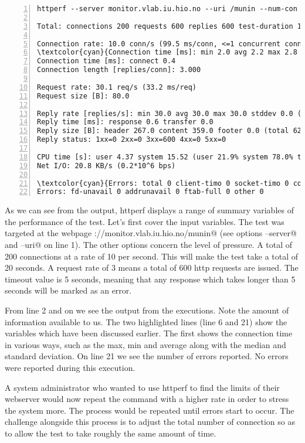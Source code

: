 \begin{Verbatim}[commandchars=\\\{\},numbers=left,label=Httperf execution example]
httperf --server monitor.vlab.iu.hio.no --uri /munin --num-con  200 --rate 10 --timeout 5 --num-call 3

Total: connections 200 requests 600 replies 600 test-duration 19.902 s

Connection rate: 10.0 conn/s (99.5 ms/conn, <=1 concurrent connections)
\textcolor{cyan}{Connection time [ms]: min 2.0 avg 2.2 max 2.8 median 2.5 stddev 0.1}
Connection time [ms]: connect 0.4
Connection length [replies/conn]: 3.000

Request rate: 30.1 req/s (33.2 ms/req)
Request size [B]: 80.0

Reply rate [replies/s]: min 30.0 avg 30.0 max 30.0 stddev 0.0 (3 samples)
Reply time [ms]: response 0.6 transfer 0.0
Reply size [B]: header 267.0 content 359.0 footer 0.0 (total 626.0)
Reply status: 1xx=0 2xx=0 3xx=600 4xx=0 5xx=0

CPU time [s]: user 4.37 system 15.52 (user 21.9% system 78.0% total 99.9%)
Net I/O: 20.8 KB/s (0.2*10^6 bps)

\textcolor{cyan}{Errors: total 0 client-timo 0 socket-timo 0 connrefused 0 connreset 0}
Errors: fd-unavail 0 addrunavail 0 ftab-full 0 other 0
\end{Verbatim}
As we can see from the output, httperf displays a range of summary variables of the performance of the test. Let's first cover the input variables. The test was targeted at the webpage \Verb@http://monitor.vlab.iu.hio.no/munin@ (see options \Verb@--server@ and \Verb@--uri@ on line 1). The other options concern the level of pressure. A total of 200 connections at a rate of 10 per second. This will make the test take a total of 20 seconds. A request rate of 3 means a total of 600 http requests are issued. The timeout value is 5 seconds, meaning that any response which takes longer than 5 seconds will be marked as an error.

From line 2 and on we see the output from the executions. Note the amount of information available to us. The two highlighted lines (line 6 and 21) show the variables which have been discussed earlier. The first shows the connection time in various ways, such as the max, min and average along with the median and standard deviation. On line 21 we see the number of errors reported. No errors were reported during this execution.

A system administrator who wanted to use httperf to find the limits of their webserver would now repeat the command with a higher rate in order to stress the system more. The process would be repeated until errors start to occur. The challenge alongside this process is to adjust the total number of connection so as to allow the test to take roughly the same amount of time.

